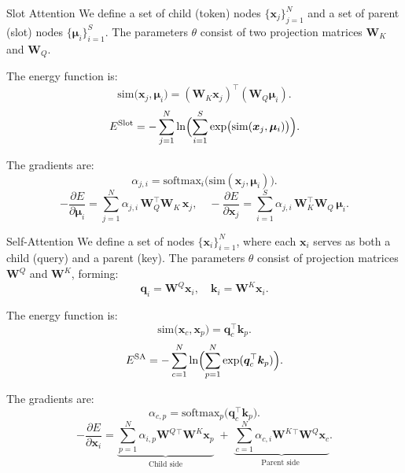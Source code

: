 \documentclass{beamer}
\begin{document}
\begin{frame}{Slot Attention}
    We define a set of child (token) nodes \(\{\bm{x}_j\}_{j=1}^N\) and a set of parent (slot) nodes \(\{\bm{\mu}_i\}_{i=1}^S\). The parameters $\theta$ consist of two projection matrices \(\bm{W}_K\) and \(\bm{W}_Q\).

    The energy function is:
    \[
    \mathrm{sim}\bigl(\bm{x}_j,\bm{\mu}_i\bigr)
    =
    (\bm{W}_K \bm{x}_j)^\top (\bm{W}_Q \bm{\mu}_i).
    \]
    \[
    E^{\mathrm{Slot}}
    =
    -\sum_{j=1}^N
    \ln \Bigl(\sum_{i=1}^S
    \exp\bigl(\mathrm{sim}(\bm{x}_j,\bm{\mu}_i)\bigr)\Bigr).
    \]

    The gradients are:
    \[
    \alpha_{j,i} = \mathrm{softmax}_i\bigl(\mathrm{sim}(\bm{x}_j,\bm{\mu}_i)\bigr).
    \]
    \[
    -\frac{\partial E}{\partial \bm{\mu}_i}
    =
    \sum_{j=1}^N
    \alpha_{j,i}\,\bm{W}_Q^\top \bm{W}_K\,\bm{x}_j,
    \quad
    -\frac{\partial E}{\partial \bm{x}_j}
    =
    \sum_{i=1}^S
    \alpha_{j,i}\,\bm{W}_K^\top \bm{W}_Q\,\bm{\mu}_i.
    \]

\end{frame}



\begin{frame}{Self-Attention}
    We define a set of nodes \(\{\bm{x}_i\}_{i=1}^N\), where each \(\bm{x}_i\) serves as both a child (query) and a parent (key). The parameters \(\theta\) consist of projection matrices \(\bm{W}^Q\) and \(\bm{W}^K\), forming:
    \[
    \bm{q}_i = \bm{W}^Q \bm{x}_i,
    \quad
    \bm{k}_i = \bm{W}^K \bm{x}_i.
    \]

    The energy function is:
    \[
    \mathrm{sim}\bigl(\bm{x}_c,\bm{x}_p\bigr)
    =
    \bm{q}_c^\top \bm{k}_p.
    \]
    \[
    E^{\mathrm{SA}}
    =
    -\sum_{c=1}^N
    \ln \Bigl(\sum_{p=1}^N \exp(\bm{q}_c^\top \bm{k}_p)\Bigr).
    \]

    The gradients are:
    \[
    \alpha_{c,p} = \mathrm{softmax}_p\bigl(\bm{q}_c^\top \bm{k}_p\bigr).
    \]
    \[
    -\frac{\partial E}{\partial \bm{x}_i}
    =
    \underbrace{\sum_{p=1}^N \alpha_{i,p} \bm{W}^Q{}^\top \bm{W}^K \bm{x}_p}_{\text{Child side}}
    \;+\;
    \underbrace{\sum_{c=1}^N \alpha_{c,i} \bm{W}^K{}^\top \bm{W}^Q \bm{x}_c}_{\text{Parent side }}.
    \]

\end{frame}
\end{document}
